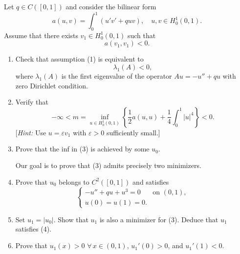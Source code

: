\documentclass[12pt]{article}
\newcommand{\abs}[1]{\left|#1\right|}
\begin{document}
\medskip
 
Let $q \in C([0,1])$ and consider the bilinear form
\[
a(u,v) = \int_0^1 (u'v' + quv), \quad u, v \in H^1_0(0,1).
\]
Assume that there exists $v_1 \in H^1_0(0,1)$ such that
\begin{equation}\tag{1}
a(v_1, v_1) < 0.
\end{equation}
 
\begin{enumerate}
\item Check that assumption (1) is equivalent to
\begin{equation}\tag{2}
\lambda_1(A) < 0,
\end{equation}
where $\lambda_1(A)$ is the first eigenvalue of the operator $Au = -u'' + qu$ with zero
Dirichlet condition.
 
\item Verify that
\begin{equation}\tag{3}
-\infty < m = \inf_{u \in H^1_0(0,1)} \left\{\frac{1}{2}a(u,u) + \frac{1}{4}\int_0^1 \abs{u}^4\right\} < 0.
\end{equation}
[\textit{Hint:} Use $u = \varepsilon v_1$ with $\varepsilon > 0$ sufficiently small.]
 
\item Prove that the inf in (3) is achieved by some $u_0$.
 
 
Our goal is to prove that (3) admits precisely two minimizers.
 
\item Prove that $u_0$ belongs to $C^2([0,1])$ and satisfies
\begin{equation}\tag{4}
\begin{cases}
-u'' + qu + u^3 = 0 & \text{on } (0,1),\\
u(0) = u(1) = 0.
\end{cases}
\end{equation}
 
\item Set $u_1 = \abs{u_0}$. Show that $u_1$ is also a minimizer for (3). Deduce that $u_1$
satisfies (4).
 
 
\item Prove that $u_1(x) > 0$ $\forall\, x \in (0,1)$, $u_1'(0) > 0$, and $u_1'(1) < 0$.
 
\noindent[\textit{Hint:} Choose a constant $a$ so large that $-u_1'' + a^2 u_1 = f \ge 0$, $f \not\equiv 0$.
Then use the strong maximum principle.]
 

\end{enumerate}
\end{document}
